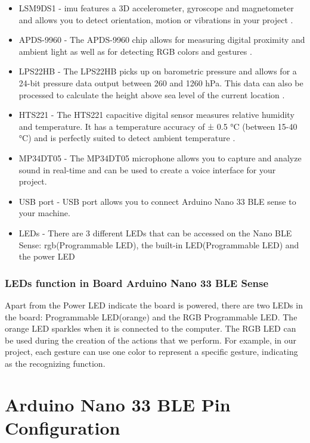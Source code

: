 \begin{itemize}
	\item LSM9DS1 - \ac{imu} features a 3D accelerometer, gyroscope and magnetometer and allows you to detect orientation, motion or vibrations in your project \cite{Alushi:2023}.
	\item  APDS-9960 - The APDS-9960 chip allows for measuring digital proximity and ambient light as well as for detecting RGB colors and gestures \cite{Avago:2015}.
	\item  LPS22HB - The LPS22HB picks up on barometric pressure and allows for a 24-bit pressure data output between 260 and 1260 hPa. This data can also be processed to calculate the height above sea level of the current location \cite{Stm:2017}.
	\item HTS221 - The HTS221 capacitive digital sensor measures relative humidity and temperature. It has a temperature accuracy of ± 0.5 °C (between 15-40 °C) and is perfectly suited to detect ambient temperature \cite{Stm:2023}.
	\item MP34DT05 - The MP34DT05 microphone allows you to capture and analyze sound in real-time and can be used to create a voice interface for your project\cite{Stm:2021}.
	\item USB port - USB port allows you to connect Arduino Nano 33 BLE sense to your machine.
	\item LEDs - There are 3 different LEDs that can be accessed on the Nano BLE Sense: \ac{rgb}(Programmable LED), the built-in LED(Programmable LED) and the power LED
\end{itemize}

\subsubsection{LEDs function in Board Arduino Nano 33 BLE Sense}
Apart from the Power LED indicate the board is powered, there are two LEDs in the board: Programmable LED(orange) and the RGB Programmable LED. The orange LED sparkles when it is connected to the computer. The RGB LED can be used during the creation of the actions that we perform. For example, in our project, each gesture can use one color to represent a specific gesture, indicating as the recognizing function. 

\section{Arduino Nano 33 BLE Pin Configuration}

